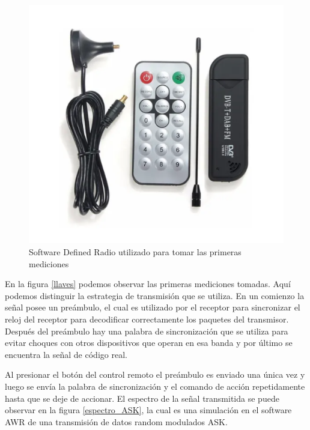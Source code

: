 \documentclass[12pt]{report}
\begin{document}
\begin{figure}[htb]
	\centering
	\includegraphics[scale=0.4]{sdr.png}
	\caption{Software Defined Radio utilizado para tomar las primeras mediciones}
	\label{SDR}
\end{figure}

En la figura \ref{llaves} podemos observar las primeras mediciones tomadas. Aquí podemos distinguir la estrategia de transmisión que se
utiliza. En un comienzo la señal posee un preámbulo, el cual es utilizado por el receptor para sincronizar el reloj del receptor  para 
decodificar correctamente los paquetes del transmisor. Después del preámbulo hay una palabra de sincronización que se utiliza para evitar 
choques con otros dispositivos que operan en esa banda y por último se encuentra la señal de código real.\par
Al presionar el botón del control remoto el preámbulo es enviado una única vez y luego se envía la palabra de sincronización y el
comando de acción repetidamente hasta que se deje de accionar. El espectro de la señal transmitida se puede observar en la figura \ref{espectro_ASK},
la cual es una simulación en el software AWR de una transmisión de datos random modulados ASK.
\end{document}
